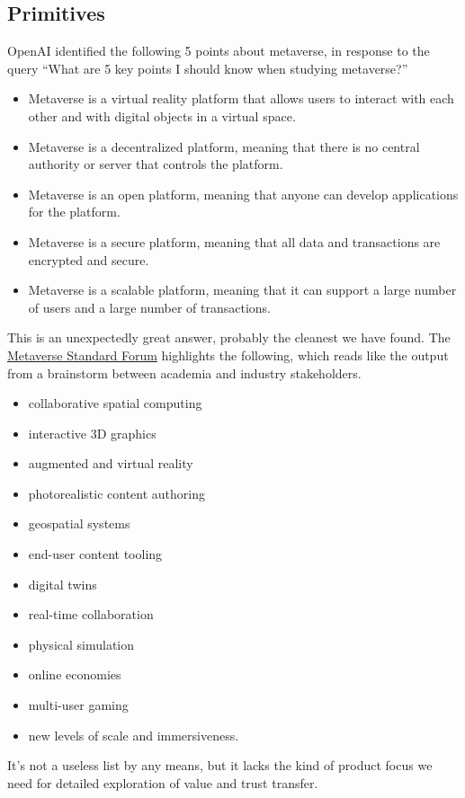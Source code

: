 \subsection{Primitives}
OpenAI identified the following 5 points about metaverse, in response to the query ``What are 5 key points I should know when studying metaverse?''
\begin{itemize}
\item Metaverse is a virtual reality platform that allows users to interact with each other and with digital objects in a virtual space.
\item Metaverse is a decentralized platform, meaning that there is no central authority or server that controls the platform.
\item Metaverse is an open platform, meaning that anyone can develop applications for the platform.
\item Metaverse is a secure platform, meaning that all data and transactions are encrypted and secure.
\item Metaverse is a scalable platform, meaning that it can support a large number of users and a large number of transactions.
\end{itemize}
This is an unexpectedly great answer, probably the cleanest we have found. The \href{https://metaverse-standards.org/}{Metaverse Standard Forum} highlights the following, which reads like the output from a brainstorm between academia and industry stakeholders.
\begin{itemize}
\item collaborative spatial computing
\item interactive 3D graphics 
\item augmented and virtual reality
\item photorealistic content authoring
\item geospatial systems
\item end-user content tooling
\item digital twins
\item real-time collaboration
\item physical simulation
\item online economies
\item multi-user gaming
\item new levels of scale and immersiveness. 
\end{itemize}
It's not a useless list by any means, but it lacks the kind of product focus we need for detailed exploration of value and trust transfer. \par

